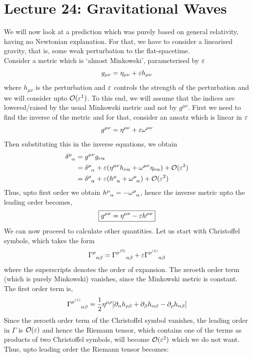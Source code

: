 \section*{Lecture 24: Gravitational Waves }
We will now look at a prediction which was purely based on general relativity, having no Newtonian explanation. For that, we have to consider a linearised gravity, that is, some weak perturbation to the flat-spacetime.\\[0.2cm]
Consider a metric which is `almost Minkowski', parameterised by $\varepsilon$
$$g_{\mu\nu} = \eta_{\mu\nu} + \varepsilon h_{\mu\nu}$$
where $h_{\mu\nu}$ is the perturbation and $\varepsilon$ controls the strength of the perturbation and we will consider upto $\mathcal O(\varepsilon^1)$. To this end, we will assume that the indices are lowered/raised by the usual Minkowski metric and not by $g^{\mu\nu}$. First we need to find the inverse of the metric and for that, consider an ansatz which is linear in $\varepsilon$
$$g^{\mu\nu} = \eta^{\mu\nu} + \varepsilon \omega^{\mu\nu}$$
Then substituting this in the inverse equations, we obtain 
\begin{align*}
    \tensor{\delta}{^\mu _\alpha} &= g^{\mu\nu} g_{\nu \alpha}\\
    &= \tensor{\delta}{^\mu _\alpha} + \vep\qty(\eta^{\mu\nu}h_{\nu\alpha} +\omega^{\mu\nu} \eta_{\nu\alpha} ) + \SO(\vep^2)\\
    &=\tensor{\delta}{^\mu _\alpha} + \vep\qty(\tensor{h}{^\mu _\alpha} +\tensor{\omega}{^\mu _\alpha} ) + \SO(\vep^2)
\end{align*}
Thus, upto first order we obtain $\tensor{h}{^\mu _\alpha} = -\tensor{\omega}{^\mu _\alpha}$, hence the inverse metric upto the leading order becomes,
$$\boxed{g^{\mu\nu} = \eta^{\mu\nu} - \varepsilon h^{\mu\nu}}$$
We can now proceed to calculate other quantities. Let us start with Christoffel symbols, which takes the form 
$$\chris{\mu}{\alpha}{\beta} ={\chris{{\mu^\text{\tiny (0)}}}{\alpha}{\beta}} +\vep {\chris{{\mu^\text{\tiny (1)}}}{\alpha}{\beta}} $$
where the superscripts denotes the order of expansion. The zeroeth order term (which is purely Minkowski) vanishes, since the Minkowski metric is constant. The first order term is,
$${\chris{{\mu^\text{{\tiny (1)}}}}{\alpha}{\beta}} = \frac{1}{2}\eta^{\mu\rho} \qty[\partial_\alpha h_{\rho\beta} +\partial_\beta h_{\alpha\beta} - \partial_\rho h_{\alpha\beta} ]$$
Since the zeroeth order term of the Christoffel symbol vanishes, the leading order in $\Gamma$ is $\mathcal O(\varepsilon)$ and hence the Riemann tensor, which contains one of the terms as products of two Christoffel symbols, will become $\mathcal O(\varepsilon^2)$ which we do not want. Thus, upto leading order the Riemann tensor becomes:
